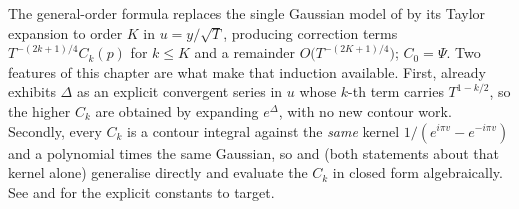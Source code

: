 \begin{remark}
\label{rem:rsf_next}
The general-order formula replaces the single Gaussian model of  by its
Taylor expansion to order $K$ in $u=y/\sqrt T$, producing correction terms
$T^{-(2k+1)/4}C_{k}(p)$ for $k\le K$ and a remainder $O\bigl(T^{-(2K+1)/4}\bigr)$;
$C_{0}=\Psi$.  Two features of this chapter are what make that induction available.  First,
 already exhibits $\Delta$ as an explicit convergent series in
$u$ whose $k$-th term carries $T^{1-k/2}$, so the higher $C_{k}$ are obtained by expanding
$e^{\Delta}$, with no new contour work.  Secondly, every $C_{k}$ is a contour integral
against the \emph{same} kernel $1/(e^{i\pi v}-e^{-i\pi v})$ and a polynomial times the same
Gaussian, so  and  (both statements about
that kernel alone) generalise directly and evaluate the $C_{k}$ in closed form algebraically.  See \cite{Gabcke} and \cite{AriasDeReyna2011} for the
explicit constants to target.
\end{remark}
